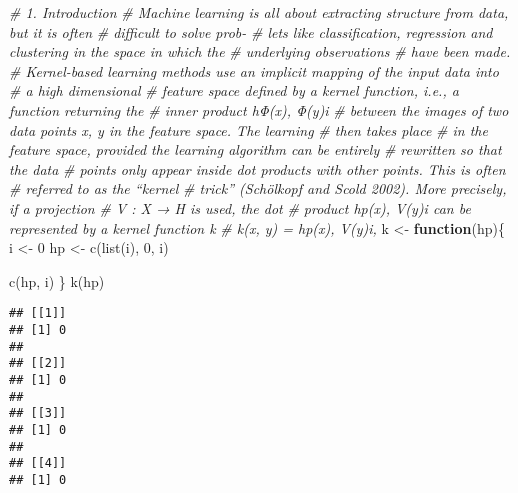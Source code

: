 \documentclass[
]{article}
\newenvironment{Shaded}{\begin{snugshade}}{\end{snugshade}}
\newcommand{\CommentTok}[1]{\textcolor[rgb]{0.56,0.35,0.01}{\textit{#1}}}
\newcommand{\ControlFlowTok}[1]{\textcolor[rgb]{0.13,0.29,0.53}{\textbf{#1}}}
\newcommand{\DecValTok}[1]{\textcolor[rgb]{0.00,0.00,0.81}{#1}}
\newcommand{\FunctionTok}[1]{\textcolor[rgb]{0.00,0.00,0.00}{#1}}
\newcommand{\NormalTok}[1]{#1}
\newcommand{\OtherTok}[1]{\textcolor[rgb]{0.56,0.35,0.01}{#1}}
\begin{document}
\begin{Shaded}
\begin{Highlighting}[]
\CommentTok{\# 1. Introduction}
\CommentTok{\# Machine learning is all about extracting structure from data, but it is often }
\CommentTok{\# difficult to solve prob{-}}
\CommentTok{\# lets like classification, regression and clustering in the space in which the }
\CommentTok{\# underlying observations}
\CommentTok{\# have been made.}
\CommentTok{\# Kernel{-}based learning methods use an implicit mapping of the input data into }
\CommentTok{\# a high dimensional}
\CommentTok{\# feature space defined by a kernel function, i.e., a function returning the }
\CommentTok{\# inner product hΦ(x), Φ(y)i}
\CommentTok{\# between the images of two data points x, y in the feature space. The learning }
\CommentTok{\# then takes place}
\CommentTok{\# in the feature space, provided the learning algorithm can be entirely }
\CommentTok{\# rewritten so that the data}
\CommentTok{\# points only appear inside dot products with other points. This is often }
\CommentTok{\# referred to as the “kernel}
\CommentTok{\# trick” (Schölkopf and Scold 2002). More precisely, if a projection }
\CommentTok{\# V : X → H is used, the dot}
\CommentTok{\# product hp(x), V(y)i can be represented by a kernel function k}
\CommentTok{\# k(x, y) = hp(x), V(y)i,}
\NormalTok{k }\OtherTok{\textless{}{-}} \ControlFlowTok{function}\NormalTok{(hp)\{}
\NormalTok{  i }\OtherTok{\textless{}{-}} \DecValTok{0}
\NormalTok{  hp }\OtherTok{\textless{}{-}} \FunctionTok{c}\NormalTok{(}\FunctionTok{list}\NormalTok{(i), }\DecValTok{0}\NormalTok{, i)}

  
  \FunctionTok{c}\NormalTok{(hp, i)}
\NormalTok{\}}
\FunctionTok{k}\NormalTok{(hp)}
\end{Highlighting}
\end{Shaded}

\begin{verbatim}
## [[1]]
## [1] 0
## 
## [[2]]
## [1] 0
## 
## [[3]]
## [1] 0
## 
## [[4]]
## [1] 0
\end{verbatim}
\end{document}
